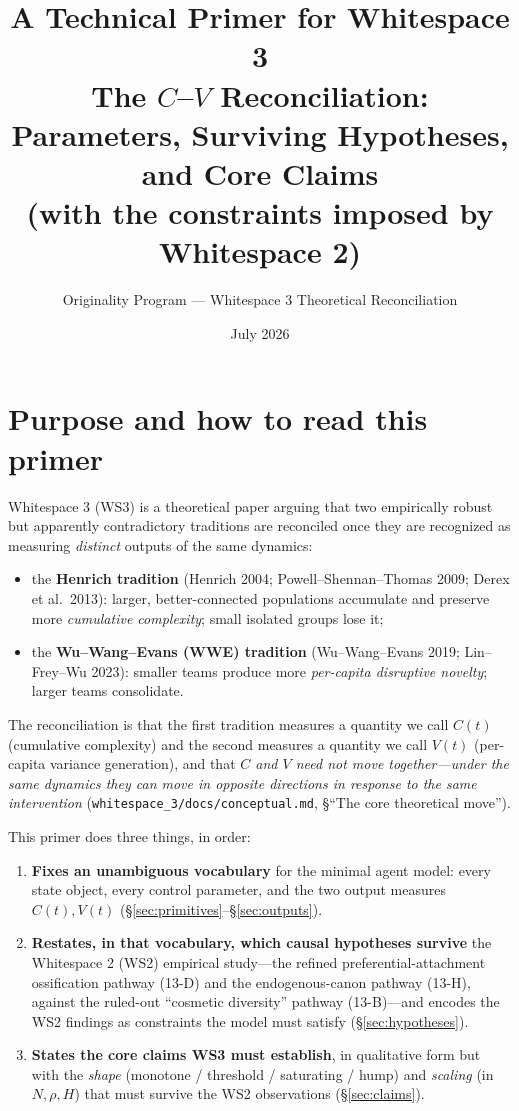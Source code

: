 \documentclass[11pt,letterpaper]{article}
\title{A Technical Primer for Whitespace 3\\[2pt]
\large The $C$--$V$ Reconciliation: Parameters, Surviving Hypotheses, and Core Claims\\
\normalsize (with the constraints imposed by Whitespace 2)}
\author{Originality Program --- Whitespace 3 Theoretical Reconciliation}
\date{July 2026}
\theoremstyle{definition}
\theoremstyle{plain}
\begin{document}
\maketitle
\tableofcontents
\clearpage

\section{Purpose and how to read this primer}

Whitespace 3 (WS3) is a theoretical paper arguing that two empirically robust
but apparently contradictory traditions are reconciled once they are recognized
as measuring \emph{distinct} outputs of the same dynamics:

\begin{itemize}[nosep]
  \item the \textbf{Henrich tradition} (Henrich 2004; Powell--Shennan--Thomas
  2009; Derex et al.\ 2013): larger, better-connected populations accumulate and
  preserve more \emph{cumulative complexity}; small isolated groups lose it;
  \item the \textbf{Wu--Wang--Evans (WWE) tradition} (Wu--Wang--Evans 2019;
  Lin--Frey--Wu 2023): smaller teams produce more \emph{per-capita disruptive
  novelty}; larger teams consolidate.
\end{itemize}

The reconciliation is that the first tradition measures a quantity we call
$C(t)$ (cumulative complexity) and the second measures a quantity we call $V(t)$
(per-capita variance generation), and that \emph{$C$ and $V$ need not move
together---under the same dynamics they can move in opposite directions in
response to the same intervention} (\texttt{whitespace\_3/docs/conceptual.md},
\S``The core theoretical move'').

This primer does three things, in order:
\begin{enumerate}[label=(\alph*),nosep]
  \item \textbf{Fixes an unambiguous vocabulary} for the minimal agent model:
  every state object, every control parameter, and the two output measures
  $C(t),V(t)$ (\S\ref{sec:primitives}--\S\ref{sec:outputs}).
  \item \textbf{Restates, in that vocabulary, which causal hypotheses survive}
  the Whitespace 2 (WS2) empirical study---the refined preferential-attachment
  ossification pathway (13-D) and the endogenous-canon pathway (13-H), against
  the ruled-out ``cosmetic diversity'' pathway (13-B)---and encodes the WS2
  findings as constraints the model must satisfy (\S\ref{sec:hypotheses}).
  \item \textbf{States the core claims WS3 must establish}, in qualitative form
  but with the \emph{shape} (monotone / threshold / saturating / hump) and
  \emph{scaling} (in $N,\rho,H$) that must survive the WS2 observations
  (\S\ref{sec:claims}).
\end{enumerate}
\end{document}

